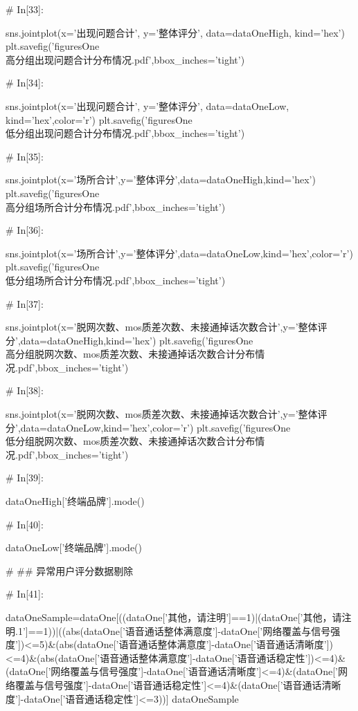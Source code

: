 \documentclass{MathorCupmodeling}
\begin{document}
\begin{python}
# In[33]:


sns.jointplot(x='出现问题合计', y='整体评分', data=dataOneHigh, kind='hex')
plt.savefig('figuresOne\\[附件1]高分组出现问题合计分布情况.pdf',bbox_inches='tight')


# In[34]:


sns.jointplot(x='出现问题合计', y='整体评分', data=dataOneLow, kind='hex',color='r')
plt.savefig('figuresOne\\[附件1]低分组出现问题合计分布情况.pdf',bbox_inches='tight')


# In[35]:


sns.jointplot(x='场所合计',y='整体评分',data=dataOneHigh,kind='hex')
plt.savefig('figuresOne\\[附件1]高分组场所合计分布情况.pdf',bbox_inches='tight')


# In[36]:


sns.jointplot(x='场所合计',y='整体评分',data=dataOneLow,kind='hex',color='r')
plt.savefig('figuresOne\\[附件1]低分组场所合计分布情况.pdf',bbox_inches='tight')


# In[37]:


sns.jointplot(x='脱网次数、mos质差次数、未接通掉话次数合计',y='整体评分',data=dataOneHigh,kind='hex')
plt.savefig('figuresOne\\[附件1]高分组脱网次数、mos质差次数、未接通掉话次数合计分布情况.pdf',bbox_inches='tight')


# In[38]:


sns.jointplot(x='脱网次数、mos质差次数、未接通掉话次数合计',y='整体评分',data=dataOneLow,kind='hex',color='r')
plt.savefig('figuresOne\\[附件1]低分组脱网次数、mos质差次数、未接通掉话次数合计分布情况.pdf',bbox_inches='tight')


# In[39]:


dataOneHigh['终端品牌'].mode()


# In[40]:


dataOneLow['终端品牌'].mode()


# ## 异常用户评分数据剔除

# In[41]:


dataOneSample=dataOne[((dataOne['其他，请注明']==1)|(dataOne['其他，请注明.1']==1))|((abs(dataOne['语音通话整体满意度']-dataOne['网络覆盖与信号强度'])<=5)&(abs(dataOne['语音通话整体满意度']-dataOne['语音通话清晰度'])<=4)&(abs(dataOne['语音通话整体满意度']-dataOne['语音通话稳定性'])<=4)&(dataOne['网络覆盖与信号强度']-dataOne['语音通话清晰度']<=4)&(dataOne['网络覆盖与信号强度']-dataOne['语音通话稳定性']<=4)&(dataOne['语音通话清晰度']-dataOne['语音通话稳定性']<=3))]
dataOneSample



\end{python}
\end{document}
